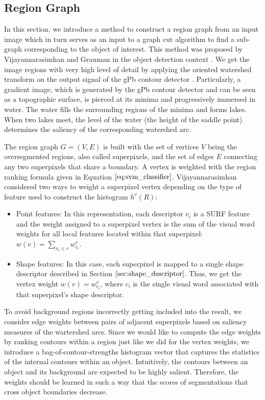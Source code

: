 \documentclass{SMBV12}
\begin{document}
\subsection{Region Graph}
\label{sec:region_graph}
In this section, we introduce a method to construct a region graph from an input image which in turn serves as an input to a graph cut algorithm to find a sub-graph corresponding to the object of interest. This method was proposed by Vijayannarasimhan and Grauman in the object detection context \cite{VijayGrauman2011}. We get the image regions with very high level of detail by applying the oriented watershed transform on the output signal of the gPb contour detector \cite{arbelaez2009contours}. Particularly, a gradient image, which is generated by the gPb contour detector and can be seen as a topographic surface, is pierced at its minima and progressively immersed in water. The water fills the surrounding regions of the minima and forms lakes. When two lakes meet, the level of the water (the height of the saddle point) determines the saliency of the corresponding watershed arc.

The region graph $G = (V, E)$ is built with the set of vertices $V$ being the oversegmented regions, also called superpixels, and the set of edges $E$ connecting any two superpixels that share a boundary. A vertex is weighted with the region ranking formula given in Equation $\ref{eq:svm_classifier}$. Vijayannarasimhan considered two ways to weight a superpixel vertex depending on the type of feature used to construct the histogram $h^v(R)$:

\begin{itemize}
\item Point features: In this representation, each descriptor $v_i$ is a SURF feature and the weight assigned to a superpixel vertex is the sum of the visual word weights for all local features located within that superpixel: $w(v) = \sum_{x_i \in v} w^v_{c_i}$.
\item Shape features: In this case, each superpixel is mapped to a single shape descriptor described in Section $\ref{sec:shape_descriptor}$. Thus, we get the vertex weight $w(v) = w^v_{c_i}$, where $c_i$ is the single visual word associated with that superpixel's shape descriptor.
\end{itemize}

To avoid background regions incorrectly getting included into the result, we consider edge weights between pairs of adjacent superpixels based on saliency measures of the wartershed arcs. Since we would like to compute the edge weights by ranking contours within a region just like we did for the vertex weights, we introduce a bag-of-contour-strengths histogram vector that captures the statistics of the internal contours within an object. Intuitively, the contours between an object and its background are expected to be highly salient. Therefore, the weights should be learned in such a way that the scores of segmentations that cross object boundaries decrease.
\end{document}
